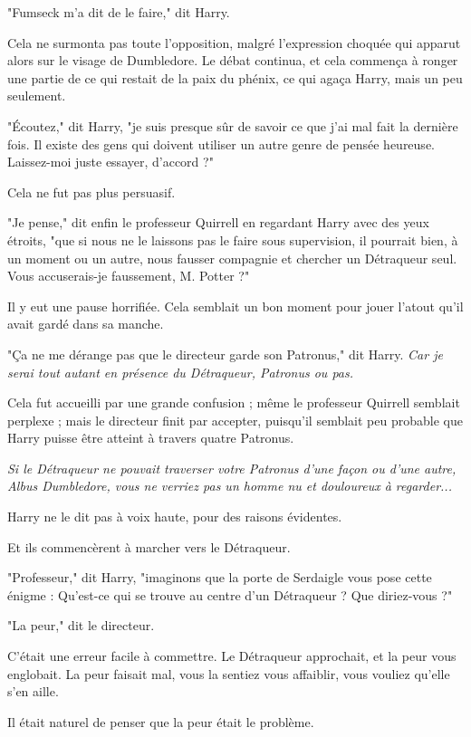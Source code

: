 "Fumseck m'a dit de le faire," dit Harry.

Cela ne surmonta pas toute l'opposition, malgré l'expression choquée qui apparut alors sur le visage de Dumbledore. Le débat continua, et cela commença à ronger une partie de ce qui restait de la paix du phénix, ce qui agaça Harry, mais un peu seulement.

"Écoutez," dit Harry, "je suis presque sûr de savoir ce que j'ai mal fait la dernière fois. Il existe des gens qui doivent utiliser un autre genre de pensée heureuse. Laissez-moi juste essayer, d'accord ?"

Cela ne fut pas plus persuasif.

"Je pense," dit enfin le professeur Quirrell en regardant Harry avec des yeux étroits, "que si nous ne le laissons pas le faire sous supervision, il pourrait bien, à un moment ou un autre, nous fausser compagnie et chercher un Détraqueur seul. Vous accuserais-je faussement, M. Potter ?"

Il y eut une pause horrifiée. Cela semblait un bon moment pour jouer l'atout qu'il avait gardé dans sa manche.

"Ça ne me dérange pas que le directeur garde son Patronus," dit Harry. \emph{Car je serai tout autant en présence du Détraqueur, Patronus ou pas.} 

Cela fut accueilli par une grande confusion ; même le professeur Quirrell semblait perplexe ; mais le directeur finit par accepter, puisqu'il semblait peu probable que Harry puisse être atteint à travers quatre Patronus.

\emph{Si le Détraqueur ne pouvait traverser votre Patronus d'une façon ou d'une autre, Albus Dumbledore, vous ne verriez pas un homme nu et douloureux à regarder...} 

Harry ne le dit pas à voix haute, pour des raisons évidentes.

Et ils commencèrent à marcher vers le Détraqueur.

"Professeur," dit Harry, "imaginons que la porte de Serdaigle vous pose cette énigme : Qu'est-ce qui se trouve au centre d'un Détraqueur ? Que diriez-vous ?"

"La peur," dit le directeur.

C'était une erreur facile à commettre. Le Détraqueur approchait, et la peur vous englobait. La peur faisait mal, vous la sentiez vous affaiblir, vous vouliez qu'elle s'en aille.

Il était naturel de penser que la peur était le problème.

